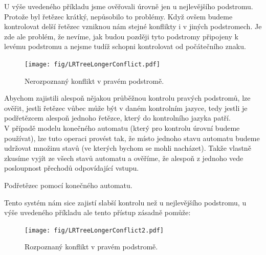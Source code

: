 U výše uvedeného příkladu jsme ověřovali úrovně jen u nejlevějšího
podstromu. Protože byl řetězec krátký, nepůsobilo to problémy.
Když ovšem budeme kontrolovat delší řetězec vzniknou nám stejné konflikty
i v jiných podstromech. Je zde ale problém, že nevíme, jak budou později
tyto podstromy připojeny k levému podstromu a nejsme tudíž schopni
kontrolovat od počátečního znaku.\\

\begin{figure}[H]
  \centering
  \texttt{[image: fig/LRTreeLongerConflict.pdf]}
  \caption{Nerozpoznaný konflikt v pravém podstromě.}
\end{figure}

Abychom zajistili alespoň nějakou průběžnou kontrolu pravých podstromů,
lze ověřit, jestli řetězec vůbec může být v daném kontrolním
jazyce, tedy jestli je podřetězcem alespoň jednoho řetězce, který do kontrolního
jazyka patří.\\

V případě modelu konečného automatu (který pro kontrolu úrovní budeme používat),
lze tuto operaci provést tak, že místo jednoho stavu automatu budeme udržovat
množinu stavů (ve kterých bychom se mohli nacházet). Takže vlastně zkusíme
vyjít ze všech stavů automatu a ověříme, že alespoň z jednoho
vede posloupnost přechodů odpovídající vstupu.\\

\begin{algorithm}[H]
  \caption{Podřetězec pomocí konečného automatu.}
  \label{alg:substr}

  \BlankLine
\end{algorithm}
\vspace{0.5cm}

Tento systém nám sice zajistí slabší kontrolu než u nejlevějšího podstromu,
u výše uvedeného příkladu ale tento přístup zásadně pomůže:

\begin{figure}[H]
  \centering
  \texttt{[image: fig/LRTreeLongerConflict2.pdf]}
  \caption{Rozpoznaný konflikt v pravém podstromě.}
\end{figure}

